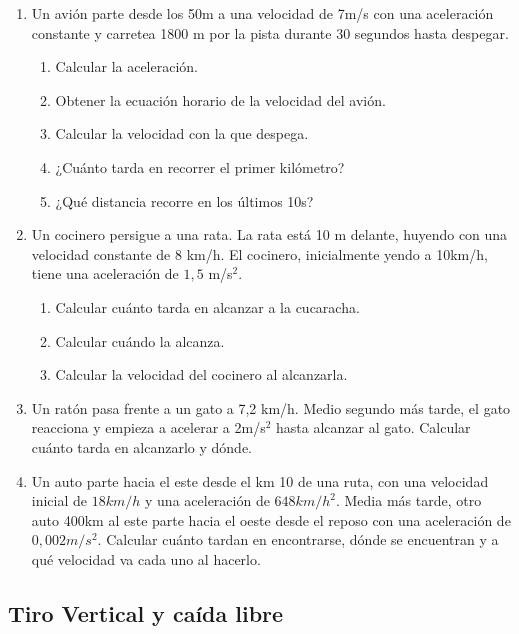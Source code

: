 \begin{enumerate}
    \item Un avión parte desde los 50m a una velocidad de 7m/s con una aceleración constante y carretea 1800 m por la pista durante 30 segundos hasta despegar.

    \begin{enumerate}
    \item Calcular la aceleración. %
    \item Obtener la ecuación horario de la velocidad del avión.
    \item Calcular la velocidad con la que despega. %
    \item ¿Cuánto tarda en recorrer el primer kilómetro? %
    \item ¿Qué distancia recorre en los últimos 10s?
    \end{enumerate}

    \item Un cocinero persigue a una rata. La rata está 10 m delante, huyendo con una velocidad constante de 8 km/h. El cocinero, inicialmente yendo a 10km/h, tiene una aceleración de $1,5$ m/s$^2$.
    \begin{enumerate}
        \item Calcular cuánto tarda en alcanzar a la cucaracha.
        \item Calcular cuándo la alcanza.
        \item Calcular la velocidad del cocinero al alcanzarla.
    \end{enumerate}

    \item Un ratón pasa frente a un gato a 7,2 km/h. Medio segundo más tarde, el gato reacciona y empieza a acelerar a 2m/s$^2$ hasta alcanzar al gato. Calcular cuánto tarda en alcanzarlo y dónde.


    \item Un auto parte hacia el este desde el km 10 de una ruta, con una velocidad inicial de $18 km/h$ y una aceleración de $648 km/h^2$. Media más tarde, otro auto 400km al este parte hacia el oeste desde el reposo con una aceleración de $0,002 m/s^2$. Calcular cuánto tardan en encontrarse, dónde se encuentran y a qué velocidad va cada uno al hacerlo.
\end{enumerate}


\newpage
\subsection{Tiro Vertical y caída libre}

